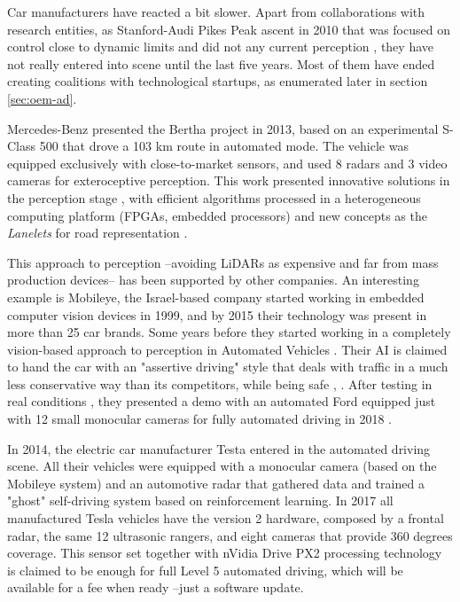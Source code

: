 Car manufacturers have reacted a bit slower. Apart from collaborations with research entities, as Stanford-Audi Pikes Peak ascent in 2010 that was focused on control close to dynamic limits and did not any current perception \cite{Funke2012}, they have not really entered into scene until the last five years. Most of them have ended creating coalitions with technological startups, as enumerated later in section \ref{sec:oem-ad}.

Mercedes-Benz presented the Bertha project in 2013, based on an experimental 
S-Class 500 that drove a 103 km route in automated mode. The vehicle was 
equipped exclusively with close-to-market sensors, and used 8 radars and 3 
video cameras for exteroceptive perception.
This work presented innovative solutions in the perception stage 
\cite{Bender2014}, with efficient algorithms processed in a heterogeneous 
computing platform (FPGAs, embedded processors) and new concepts as the 
\emph{Lanelets} for road representation \cite{Ziegler2014}. 

This approach to perception --avoiding LiDARs as expensive and far from mass 
production devices-- has been supported by other companies. An interesting 
example is Mobileye, the Israel-based company started working in embedded 
computer vision devices in 1999, and by 2015 their technology was present in 
more than 25 car brands. Some years before they started working in a completely 
vision-based approach to perception in Automated Vehicles \cite{Mobileye2018}. 
Their AI is claimed to hand the car with an "assertive driving" style that 
deals with traffic in a much less conservative way than its competitors, while 
being safe \cite{Shalev-shwartz2016}, \cite{Shalev-Shwartz2017}. 
After testing in real conditions \cite{Edelstein2018}, they presented a demo with an automated Ford equipped just with 12 small monocular cameras for fully automated driving in 2018 \cite{Scheer2018}.

In 2014, the electric car manufacturer Testa entered in the automated driving scene. All their vehicles were equipped with a monocular camera (based on the Mobileye system) and an automotive radar that gathered data and trained a "ghost" self-driving system based on reinforcement learning. In 2017 all manufactured Tesla vehicles have the version 2 hardware, composed by a frontal radar, the same 12 ultrasonic rangers, and eight cameras that provide 360 degrees coverage. This sensor set together with nVidia Drive PX2 processing technology is claimed to be enough for full Level 5 automated driving, which will be available for a fee when ready --just a software update.

